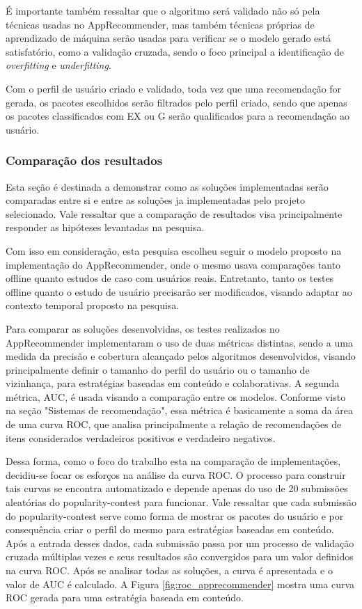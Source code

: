 É importante também ressaltar que o algoritmo será validado não só pela técnicas usadas no AppRecommender, mas também técnicas próprias de
aprendizado de máquina serão usadas para verificar se o modelo gerado está satisfatório, como a validação cruzada, sendo o foco principal a
identificação de \textit{overfitting} e \textit{underfitting}.

Com o perfil de usuário criado e validado, toda vez que uma recomendação for gerada, os pacotes escolhidos serão filtrados pelo perfil criado,
sendo que apenas os pacotes classificados com EX ou G serão qualificados para a recomendação ao usuário.

\subsubsection{Comparação dos resultados}

Esta seção é destinada a demonstrar como as soluções implementadas serão
comparadas entre si e entre as soluções ja implementadas pelo projeto
selecionado. Vale ressaltar que a comparação de resultados visa principalmente
responder as hipóteses levantadas na pesquisa.

Com isso em consideração, esta pesquisa escolheu seguir o modelo proposto na
implementação do AppRecommender, onde o mesmo usava comparações tanto offline
quanto estudos de caso com usuários reais. Entretanto, tanto os testes offline
quanto o estudo de usuário precisarão ser modificados, visando adaptar ao
contexto temporal proposto na pesquisa.


Para comparar as soluções desenvolvidas, os testes realizados no AppRecommender
implementaram o uso de duas métricas distintas, sendo a uma medida da precisão e
cobertura alcançado pelos algoritmos desenvolvidos, visando principalmente
definir o tamanho do perfil do usuário ou o tamanho de vizinhança, para
estratégias baseadas em conteúdo e colaborativas. A segunda métrica, AUC, é
usada visando a comparação entre os modelos. Conforme visto na seção "Sistemas
de recomendação", essa métrica é basicamente a soma da área de uma curva ROC,
que analisa principalmente a relação de recomendações de itens considerados
verdadeiros positivos e verdadeiro negativos.

Dessa forma, como o foco do trabalho esta na comparação de implementações,
decidiu-se focar os esforços na análise da curva ROC. O processo para construir
tais curvas se encontra automatizado e depende apenas do uso de
20 submissões aleatórias do popularity-contest para funcionar. Vale ressaltar
que cada submissão do popularity-contest serve como forma de mostrar os pacotes
do usuário e por consequência criar o perfil do mesmo para estratégias baseadas
em conteúdo. Após a entrada desses dados, cada submissão passa por um processo de
validação cruzada múltiplas vezes e seus resultados são convergidos para um
valor definidos na curva ROC. Após se analisar todas as soluções, a curva é
apresentada e o valor de AUC é calculado. A Figura \ref{fig:roc_apprecommender}
mostra uma curva ROC gerada para uma estratégia baseada em conteúdo.

